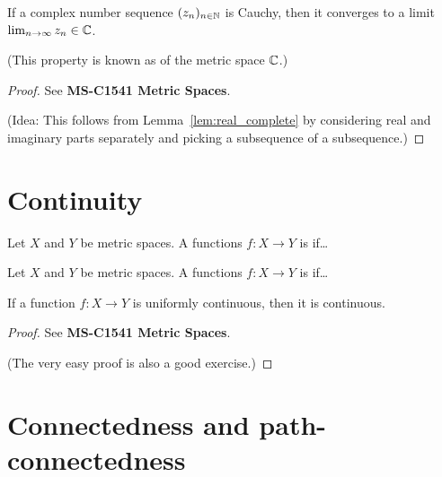 \begin{lemma}
  \label{lem:complex_complete}
  If a complex number sequence $(z_n)_{n \in \mathbb{N}}$ is Cauchy,
  then it converges to a limit $\lim_{n \to \infty} z_n \in \mathbb{C}$.

  (This property is known as  of the metric space $\mathbb{C}$.)
\end{lemma}
\begin{proof}
  See \textbf{MS-C1541 Metric Spaces}.

  (Idea: This follows from Lemma~\ref{lem:real_complete} by
  considering real and imaginary parts separately and picking
  a subsequence of a subsequence.)
\end{proof}



\section{Continuity}

\begin{definition}[Continuity]
  \label{def:continuous}
  Let $X$ and $Y$ be metric spaces.
  A functions $f \colon X \to Y$ is  if\ldots
\end{definition}

\begin{definition}
  \label{def:uniformly_continuous}
  Let $X$ and $Y$ be metric spaces.
  A functions $f \colon X \to Y$ is  if\ldots
\end{definition}

\begin{lemma}
  \label{lem:uniformly_continuous_implies_continuous}
  If a function $f \colon X \to Y$ is uniformly continuous, then it is continuous.
\end{lemma}
\begin{proof}
  See \textbf{MS-C1541 Metric Spaces}.

  (The very easy proof is also a good exercise.)
\end{proof}



\section{Connectedness and path-connectedness}

